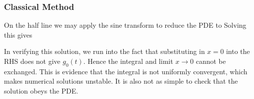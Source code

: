 \documentclass{article}
\begin{document}
\subsubsection{Classical Method}
On the half line we may apply the sine transform to reduce the PDE to 
Solving this gives 
\begin{remark}
In verifying this solution, we run into the fact that substituting in $x=0$ into the RHS does not give $g_0(t)$. Hence the integral and limit $x\to 0$ cannot be exchanged. This is evidence that the integral is not uniformly convergent, which makes numerical solutions unstable. It is also not as simple to check that the solution obeys the PDE.
\end{remark}
\end{document}
